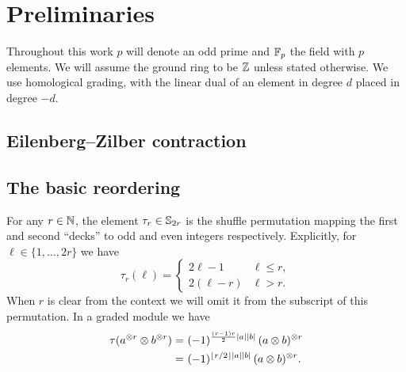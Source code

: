 
\section{Preliminaries}

Throughout this work $p$ will denote an odd prime and ${\mathbb{F}_p}$ the field with $p$ elements.
We will assume the ground ring to be $\mathbb{Z}$ unless stated otherwise.
We use homological grading, with the linear dual of an element in degree $d$ placed in degree $-d$.

\subsection{Eilenberg--Zilber contraction}

\TBW

\subsection{The basic reordering}\label{ss:reordering}

For any $r\in\mathbb{N}$, the element $\tau_r \in \mathbb{S}_{2r}$ is the shuffle permutation mapping the first and second ``decks'' to odd and even integers respectively.
Explicitly, for $\ell \in \{1,\dots,2r\}$ we have
\begin{equation*}
	\tau_r(\ell) =
	\begin{cases}
		2\ell-1 & \ell \leq r, \\
		2(\ell-r) & \ell > r.
	\end{cases}
\end{equation*}
When $r$ is clear from the context we will omit it from the subscript of this permutation.
In a graded module we have
\begin{align*}
	\tau(a^{\otimes r} \otimes b^{\otimes r}) =&\
	(-1)^{\frac{(r-1)r}{2}\lvert a\rvert\lvert b\rvert} \, (a \otimes b)^{\otimes r} \\ =&\
	(-1)^{\lfloor r/2\rfloor\lvert a\rvert\lvert b\rvert} \, (a \otimes b)^{\otimes r}.
\end{align*}